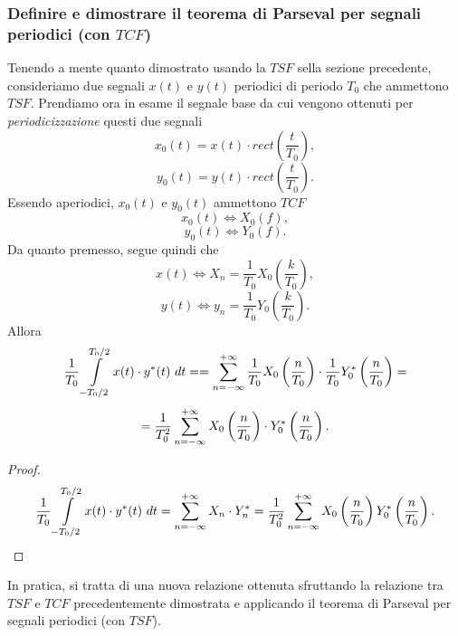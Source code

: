 \documentclass[12pt,oneside,openany]{memoir}
\numberwithin{equation}{subsection}
\newcommand{\dt}{\ dt}
\begin{document}

\subsubsection{Definire e dimostrare il teorema di Parseval per segnali
periodici (con $TCF$)}
Tenendo a mente quanto dimostrato usando la $TSF$ sella sezione precedente,
consideriamo due segnali $x(t)$ e $y(t)$ periodici di periodo $T_0$ che
ammettono $TSF$. Prendiamo ora in esame il segnale base da cui vengono ottenuti
per \textit{periodicizzazione} questi due segnali
\[
    x_0(t) = x(t) \cdot rect\left(\frac{t}{T_0}\right),
\]
\[
    y_0(t) = y(t) \cdot rect\left(\frac{t}{T_0}\right).
\]
Essendo aperiodici, $x_0(t)$ e $y_0(t)$ ammettono $TCF$
\[
    x_0(t) \iff X_0(f),
\]
\[
    y_0(t) \iff Y_0(f).
\]
Da quanto premesso, segue quindi che
\[
    x(t) \iff X_n = \frac{1}{T_0} X_0\left(\frac{k}{T_0}\right),
\]
\[
    y(t) \iff y_n = \frac{1}{T_0} Y_0\left(\frac{k}{T_0}\right).
\]
Allora
\[
    \frac{1}{T_0} \int\displaylimits_{-T_0/2}^{T_0/2} x(t) \cdot y^*(t) \dt =
    = \sum\displaylimits_{n = -\infty}^{+\infty} \frac{1}{T_0}
    X_0\left(\frac{n}{T_0}\right) \cdot \frac{1}{T_0}
    Y_0^*\left(\frac{n}{T_0}\right) =
\]
\[
    =\frac{1}{T_0^2} \sum\displaylimits_{n = -\infty}^{+\infty}
    X_0\left(\frac{n}{T_0}\right) \cdot Y_0^*\left(\frac{n}{T_0}\right).
\]
\begin{proof}
\[
    \frac{1}{T_0} \int\displaylimits_{-T_0/2}^{T_0/2} x(t) \cdot y^*(t) \dt =
    \sum\displaylimits_{n = -\infty}^{+\infty} X_n \cdot Y^*_n = \frac{1}{T_0^2}
    \sum\displaylimits_{n = -\infty}^{+\infty} X_0\left(\frac{n}{T_0}\right)
    Y_0^*\left(\frac{n}{T_0}\right).
\]
\end{proof}
In pratica, si tratta di una nuova relazione ottenuta sfruttando la relazione
tra $TSF$ e $TCF$ precedentemente dimostrata e applicando il teorema di Parseval
per segnali periodici (con $TSF$).

\end{document}
